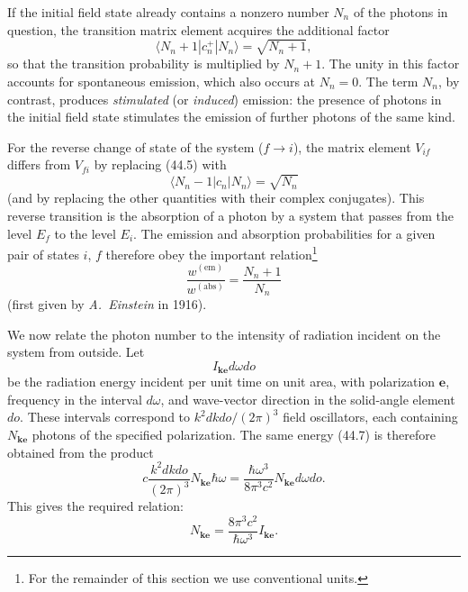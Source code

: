 If the initial field state already contains a nonzero number $N_n$ of the photons in question, the transition matrix element acquires the additional factor
\begin{equation}
\langle N_n+1|c_n^+|N_n\rangle=\sqrt{N_n+1},
\tag{44.5}
\end{equation}
so that the transition probability is multiplied by $N_n+1$. The unity in this factor accounts for spontaneous emission, which also occurs at $N_n=0$. The term $N_n$, by contrast, produces \emph{stimulated} (or \emph{induced}) emission: the presence of photons in the initial field state stimulates the emission of further photons of the same kind.

For the reverse change of state of the system ($f\to i$), the matrix element $V_{if}$ differs from $V_{fi}$ by replacing (44.5) with
\[
\langle N_n-1|c_n|N_n\rangle=\sqrt{N_n}
\]
(and by replacing the other quantities with their complex conjugates). This reverse transition is the absorption of a photon by a system that passes from the level $E_f$ to the level $E_i$. The emission and absorption probabilities for a given pair of states $i$, $f$ therefore obey the important relation\footnote{For the remainder of this section we use conventional units.}
\begin{equation}
\frac{w^{(\text{em})}}{w^{(\text{abs})}}=\frac{N_n+1}{N_n}
\tag{44.6}
\end{equation}
(first given by \emph{A.~Einstein} in 1916).

We now relate the photon number to the intensity of radiation incident on the system from outside. Let
\begin{equation}
I_{\mathbf k\mathbf e}d\omega do
\tag{44.7}
\end{equation}
be the radiation energy incident per unit time on unit area, with polarization $\mathbf e$, frequency in the interval $d\omega$, and wave-vector direction in the solid-angle element $do$. These intervals correspond to $k^2dkdo/(2\pi)^3$ field oscillators, each containing $N_{\mathbf k\mathbf e}$ photons of the specified polarization. The same energy (44.7) is therefore obtained from the product
\[
c\frac{k^2dkdo}{(2\pi)^3}N_{\mathbf k\mathbf e}\hbar\omega
=\frac{\hbar\omega^3}{8\pi^3c^2}N_{\mathbf k\mathbf e}d\omega do.
\]
This gives the required relation:
\begin{equation}
N_{\mathbf k\mathbf e}=\frac{8\pi^3c^2}{\hbar\omega^3}I_{\mathbf k\mathbf e}.
\tag{44.8}
\end{equation}

